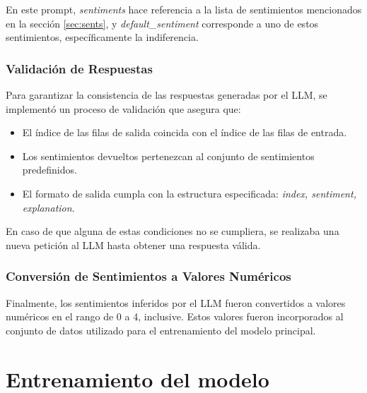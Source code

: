 En este prompt, \textit{sentiments} hace referencia a la lista de sentimientos 
mencionados en la sección \ref{sec:sents}, y \textit{default\_sentiment} corresponde a 
uno de estos sentimientos, específicamente la indiferencia.

\subsubsection{Validación de Respuestas}

Para garantizar la consistencia de las respuestas generadas por el LLM, se 
implementó un proceso de validación que asegura que:
\begin{itemize}
\item El \'indice de las filas de salida coincida con el \'indice de las filas de entrada.

\item Los sentimientos devueltos pertenezcan al conjunto de sentimientos predefinidos.

\item El formato de salida cumpla con la estructura especificada: 
\textit{index, sentiment, explanation}.
\end{itemize}
En caso de que alguna de estas condiciones no se cumpliera, se realizaba una 
nueva petición al LLM hasta obtener una respuesta válida.

\subsubsection{Conversión de Sentimientos a Valores Numéricos}

Finalmente, los sentimientos inferidos por el LLM fueron convertidos a 
valores numéricos en el rango de 0 a 4, inclusive. Estos valores fueron 
incorporados al conjunto de datos utilizado para el entrenamiento del 
modelo principal.

\section{Entrenamiento del modelo}

